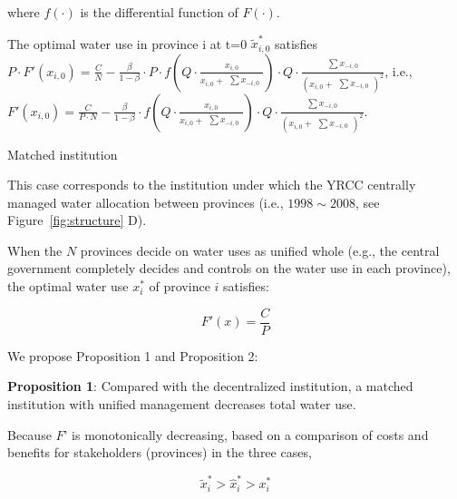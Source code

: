 \documentclass{nsr}
\begin{document}
\begin{case}
    where $f(\cdot)$ is the differential function of $F(\cdot)$.

    The optimal water use in province i at t=0 $\widetilde x_{i,0}^*$ satisfies $P \cdot F'(x_{i,0})=\frac{C}{N}-\frac{\beta}{1-\beta} \cdot P \cdot f(Q \cdot \frac{x_{i,0}}{x_{i,0} + \begin{matrix} \sum x_{-i,0} \end{matrix}}) \cdot Q \cdot \frac{\begin{matrix} \sum x_{-i,0} \end{matrix}}{(x_{i,0} + \begin{matrix} \sum x_{-i,0} \end{matrix})^2}$, i.e., $F'(x_{i,0})=\frac{C}{P \cdot N} - \frac{\beta}{1-\beta} \cdot f(Q \cdot \frac{x_{i,0}}{x_{i,0} + \begin{matrix} \sum x_{-i,0} \end{matrix}}) \cdot Q \cdot \frac{\begin{matrix} \sum x_{-i,0} \end{matrix}}{(x_{i,0} + \begin{matrix} \sum x_{-i,0} \end{matrix})^2}$.

\end{case}

\begin{case} Matched institution

    This case corresponds to the institution under which the YRCC centrally managed water allocation between provinces (i.e., $1998\sim2008$, see Figure~\ref{fig:structure} D).

    When the $N$ provinces decide on water uses as unified whole (e.g., the central government completely decides and controls on the water use in each province), the optimal water use $x_i^*$ of province $i$ satisfies:

    $$F'(x)=\frac{C}{P}$$

\end{case}

We propose Proposition 1 and Proposition 2:

\textbf{Proposition 1}: Compared with the decentralized institution, a matched institution with unified management decreases total water use.

Because $F’$ is monotonically decreasing, based on a comparison of costs and benefits for stakeholders (provinces) in the three cases,

$$\widetilde x_i^*>\hat x_i^*>x_i^*$$
\end{document}
